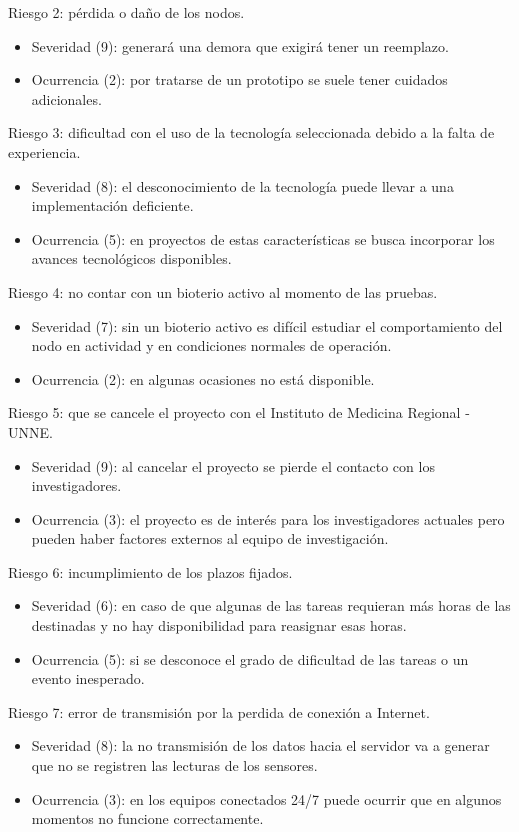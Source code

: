 \documentclass[
11pt, %
]{charter}
\begin{document}
Riesgo 2: pérdida o daño de los nodos.
\begin{itemize}
	\item Severidad (9): generará una demora  que exigirá tener un reemplazo.
	\item Ocurrencia (2): por tratarse de un prototipo se suele tener cuidados adicionales.
\end{itemize}

Riesgo 3: dificultad con el uso de la tecnología seleccionada debido a la falta de experiencia.
\begin{itemize}
	\item Severidad (8): el desconocimiento de la tecnología puede llevar a una implementación deficiente.
	\item Ocurrencia (5): en proyectos de estas características se busca incorporar los avances tecnológicos disponibles.
\end{itemize}

Riesgo 4: no contar con un bioterio activo al momento de las pruebas.
\begin{itemize}
	\item Severidad (7): sin un bioterio activo es difícil estudiar el comportamiento del nodo en actividad y en condiciones normales de operación.
	\item Ocurrencia (2): en algunas ocasiones no está disponible.
\end{itemize}

Riesgo 5: que se cancele el proyecto con el Instituto de Medicina Regional - UNNE.
\begin{itemize}
	\item Severidad (9): al cancelar el proyecto se pierde el contacto con los investigadores.
	\item Ocurrencia (3): el proyecto es de interés para los investigadores actuales pero pueden haber factores externos al equipo de investigación.
\end{itemize}

Riesgo 6: incumplimiento de los plazos fijados.
\begin{itemize}
	\item Severidad (6): en caso de que algunas de las tareas requieran más horas de las destinadas y no hay disponibilidad para reasignar esas horas.
	\item Ocurrencia (5): si se desconoce el grado de dificultad de las tareas o un evento inesperado.
\end{itemize}

Riesgo 7: error de transmisión por la perdida de conexión a Internet.
\begin{itemize}
	\item Severidad (8): la no transmisión de los datos hacia el servidor va a generar que no se registren las lecturas de los sensores.
	\item Ocurrencia (3): en los equipos conectados 24/7 puede ocurrir que en algunos momentos no funcione correctamente.
\end{itemize}
\end{document}
